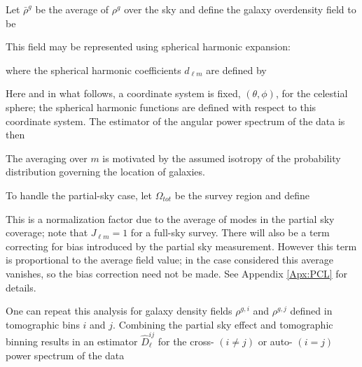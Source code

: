 \qquad Let $\bar{\rho}^g$ be the average of $\rho^g$ over the sky and define the galaxy overdensity field to be  


\noindent This field may be represented using spherical harmonic expansion:


\noindent where the spherical harmonic coefficients $d_{\ell m}$ are defined by


\noindent Here and in what follows, a coordinate system is fixed, $(\theta, \phi)$, for the celestial sphere; the spherical harmonic functions are defined with respect to this coordinate system. The estimator of the angular power spectrum of the data is then


\noindent The averaging over $m$ is motivated by the assumed isotropy of the probability distribution governing the location of galaxies.

\qquad To handle the partial-sky case, let $\Omega_{tot}$ be the survey region and define


\noindent This is a normalization factor due to the average of modes in the partial sky coverage; note that $J_{\ell m}=1$ for a full-sky survey. There will also be a term correcting for bias introduced by the partial sky measurement. However this term is proportional to the average field value; in the case considered this average vanishes, so the bias correction need not be made. See Appendix \ref{Apx:PCL} for details. 

\qquad One can repeat this analysis for galaxy density fields $\rho^{g, i}$ and $\rho^{g, j}$ defined in tomographic bins $i$ and $j$. Combining the partial sky effect and tomographic binning results in an estimator $\hat{D}_{\ell}^{i j}$ for the cross- $(i \neq j)$ or auto- $(i = j)$ power spectrum of the data


